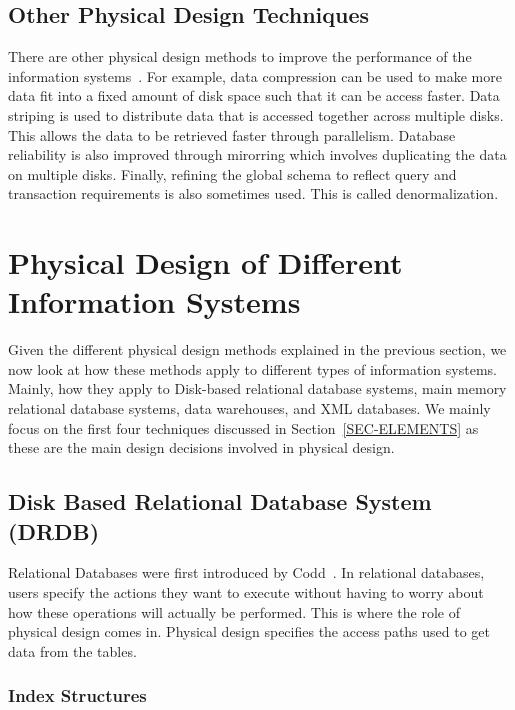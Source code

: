\documentclass[12pt,a4paper]{article}
\begin{document}
\subsection{Other Physical Design Techniques}

There are other physical design methods to improve the performance of the information systems~\cite{lightstone2007physical}. For example, data compression can
be used to make more data fit into a fixed amount of disk space such that it can be access faster. Data striping is used to distribute data that is accessed
together across multiple disks. This allows the data to be retrieved faster through parallelism. Database reliability is also improved through mirorring which
involves duplicating the data on multiple disks. Finally, refining the global schema to reflect query and transaction requirements is also sometimes used. This
is called denormalization.

\section{Physical Design of Different Information Systems}
\label{SEC-DIFFSYS}

Given the different physical design methods explained in the previous section, we now look at how these methods apply to different types of information systems.
Mainly, how they apply to Disk-based relational database systems, main memory relational database systems, data warehouses, and XML databases. We mainly focus
on the first four techniques discussed in Section~\ref{SEC-ELEMENTS} as these are the main design decisions involved in physical design.


\subsection{Disk Based Relational Database System (DRDB)}
\label{SEC-DDRDB}

Relational Databases were first introduced by Codd~\cite{codd1970relational}. In relational databases, users specify the actions they want to execute without
having to worry about how these operations will actually be performed. This is where the role of physical design comes in. Physical design specifies the access
paths used to get data from the tables. 


\subsubsection{Index Structures}
\end{document}
